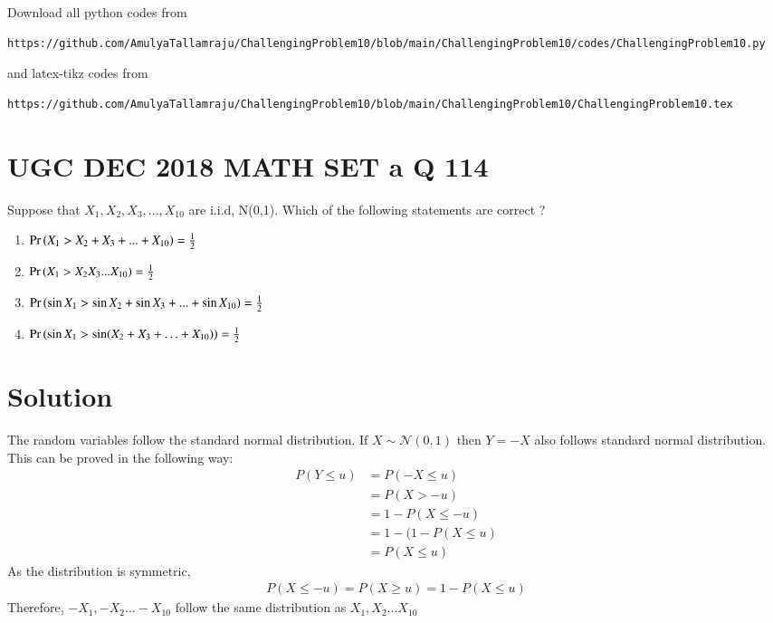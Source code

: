 \documentclass[journal,12pt,twocolumn]{IEEEtran}
\begin{document}
\maketitle
\newpage
\bigskip
\renewcommand{\thefigure}{\theenumi}
\renewcommand{\thetable}{\theenumi}
\newcommand*{\permcomb}[4][0mu]{{{}^{#3}\mkern#1#2_{#4}}}
\newcommand*{\perm}[1][-3mu]{\permcomb[#1]{P}}
\newcommand*{\comb}[1][-1mu]{\permcomb[#1]{C}}
Download all python codes from 
\begin{lstlisting}
https://github.com/AmulyaTallamraju/ChallengingProblem10/blob/main/ChallengingProblem10/codes/ChallengingProblem10.py
\end{lstlisting}
%
and latex-tikz codes from 
%
\begin{lstlisting}
https://github.com/AmulyaTallamraju/ChallengingProblem10/blob/main/ChallengingProblem10/ChallengingProblem10.tex
\end{lstlisting}
\section*{UGC DEC 2018 MATH SET a Q 114}
Suppose that $X_1,X_2,X_3,...,X_{10}$ are i.i.d, N(0,1). Which of the following statements are correct ?
\begin{enumerate}[label = (\Alph*)]
    \item $\Pr\left(X_1>X_2+X_3+...+X_{10}\right)=\frac{1}{2}$
    \item $\Pr\left(X_1>X_2X_3...X_{10}\right)=\frac{1}{2}$
    \item $\Pr\left(\sin{X_1}>\sin{X_2}+\sin{X_3}+...+\sin{X_{10}}\right)=\frac{1}{2}$
    \item $\Pr\left(\sin{X_1}>\sin({X_2+X_3+\ldots+X_{10}})\right)=\frac{1}{2}$
\end{enumerate}
\section*{Solution}
The random variables follow the standard normal distribution. If $X \sim \mathcal{N}(0,1)$ then $Y =-X$ also follows standard normal distribution. This can be proved in the following way:
\begin{align}
    P(Y \leq u) &= P(-X \leq u) \\
    &= P(X > -u) \\
    &= 1 - P(X \leq -u) \\
    &= 1 - (1 - P(X \leq u) \\
    &= P(X \leq u) 
\end{align}
As the distribution is symmetric, \begin{align}
 P(X\leq -u)=P(X\geq u)= 1-P(X\leq u)   
\end{align} 
Therefore, $-X_1,-X_2 ... -X_{10}$ follow the same distribution as $X_1,X_2...X_{10}$
\end{document}
